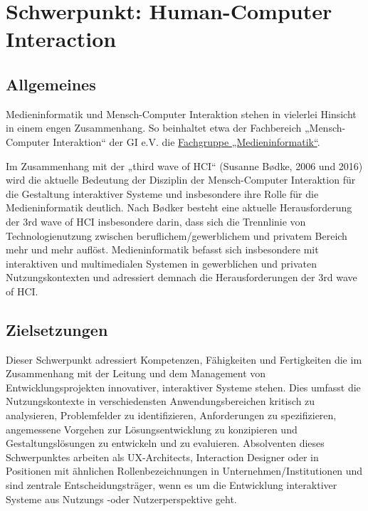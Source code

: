 \chapter{Schwerpunkt: Human-Computer
Interaction\label{/mi-2017/modulbeschreibungen-master/schwerpunkt-human-computer-interaction}}\label{schwerpunkt-human-computer-interactionpathlabelmi-2017modulbeschreibungen-masterschwerpunkt-human-computer-interaction}

\section*{Allgemeines\label{/mi-2017/modulbeschreibungen-master/schwerpunkt-human-computer-interaction}}\label{allgemeinespathlabelmi-2017modulbeschreibungen-masterschwerpunkt-human-computer-interaction}

Medieninformatik und Mensch-Computer Interaktion stehen in vielerlei
Hinsicht in einem engen Zusammenhang. So beinhaltet etwa der Fachbereich
„Mensch-Computer Interaktion`` der GI e.V. die
\href{http://fb-mci.gi.de/mensch-computer-interaktion-mci/fachgruppen/medieninformatik.html}{Fachgruppe
„Medieninformatik``}.

Im Zusammenhang mit der „third wave of HCI`` (Susanne Bødke, 2006 und
2016) wird die aktuelle Bedeutung der Disziplin der Mensch-Computer
Interaktion für die Gestaltung interaktiver Systeme und insbesondere
ihre Rolle für die Medieninformatik deutlich. Nach Bødker besteht eine
aktuelle Herausforderung der 3rd wave of HCI insbesondere darin, dass
sich die Trennlinie von Technologienutzung zwischen
beruflichem/gewerblichem und privatem Bereich mehr und mehr auflöst.
Medieninformatik befasst sich insbesondere mit interaktiven und
multimedialen Systemen in gewerblichen und privaten Nutzungskontexten
und adressiert demnach die Herausforderungen der 3rd wave of HCI.

\section*{Zielsetzungen\label{/mi-2017/modulbeschreibungen-master/schwerpunkt-human-computer-interaction}}\label{zielsetzungenpathlabelmi-2017modulbeschreibungen-masterschwerpunkt-human-computer-interaction}

Dieser Schwerpunkt adressiert Kompetenzen, Fähigkeiten und Fertigkeiten
die im Zusammenhang mit der Leitung und dem Management von
Entwicklungsprojekten innovativer, interaktiver Systeme stehen. Dies
umfasst die Nutzungskontexte in verschiedensten Anwendungsbereichen
kritisch zu analysieren, Problemfelder zu identifizieren, Anforderungen
zu spezifizieren, angemessene Vorgehen zur Lösungsentwicklung zu
konzipieren und Gestaltungslösungen zu entwickeln und zu evaluieren.
Absolventen dieses Schwerpunktes arbeiten als UX-Architects, Interaction
Designer oder in Positionen mit ähnlichen Rollenbezeichnungen in
Unternehmen/Institutionen und sind zentrale Entscheidungsträger, wenn es
um die Entwicklung interaktiver Systeme aus Nutzungs -oder
Nutzerperspektive geht.

